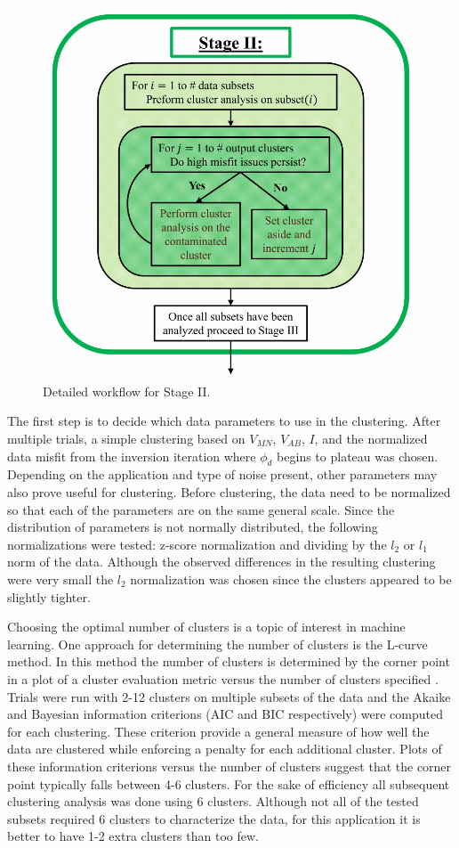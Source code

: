 \documentclass[final,authoryear,5p,times,twocolumn]{elsarticle}
\begin{document}
\begin{figure} [!ht]
\begin{center}
   \includegraphics[trim=0cm 0cm 0cm 0cm, clip=true,width=0.75\linewidth]{./Figures/Fig11.pdf}     
\end{center}
\caption{Detailed workflow for Stage II.}
\label{fig:DataQC_workflow_StageII}
\end{figure}

The first step is to decide which data parameters to use in the clustering. After multiple trials, a simple clustering based on $V_{MN}$, $V_{AB}$, $I$, and the normalized data misfit from the inversion iteration where $\phi_d$ begins to plateau was chosen. Depending on the application and type of noise present, other parameters may also prove useful for clustering. Before clustering, the data need to be normalized so that each of the parameters are on the same general scale. Since the distribution of parameters is not normally distributed, the following normalizations were tested: z-score normalization and dividing by the $l_{2}$ or $l_{1}$ norm of the data. Although the observed differences in the resulting clustering were very small the $l_{2}$ normalization was chosen since the clusters appeared to be slightly tighter. 

Choosing the optimal number of clusters is a topic of interest in machine learning. One approach for determining the number of clusters is the L-curve method. In this method the number of clusters is determined by the corner point in a plot of a cluster evaluation metric versus the number of clusters specified \citep{Salvador2004}. Trials were run with 2-12 clusters on multiple subsets of the data and the Akaike and Bayesian information criterions (AIC and BIC respectively) were computed for each clustering. These criterion provide a general measure of how well the data are clustered while enforcing a penalty for each additional cluster. Plots of these information criterions versus the number of clusters suggest that the corner point typically falls between 4-6 clusters. For the sake of efficiency all subsequent clustering analysis was done using 6 clusters. Although not all of the tested subsets required 6 clusters to characterize the data, for this application it is better to have 1-2 extra clusters than too few.  
\end{document}
